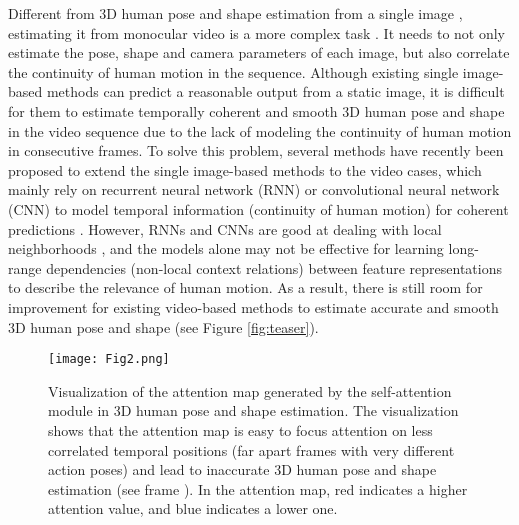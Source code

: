 \documentclass[10pt,twocolumn,letterpaper]{article}
\begin{document}
Different from 3D human pose and shape estimation from a single image \cite{hmrKanazawa17,omran2018nbf,Pavlakos2018LearningTE,Kolotouros2019LearningTR,Georgakis2020HierarchicalKH}, estimating it from monocular video is a more complex task \cite{Kanazawa2019Learning3H,Doersch2019Sim2realTL,Yu2019HumanMR,Kocabas2020VIBEVI,Luo_2020_ACCV,choi2020beyond}. It needs to not only estimate the pose, shape and camera parameters of each image, but also correlate the continuity of human motion in the sequence. Although existing single image-based methods can predict a reasonable output from a static image, it is difficult for them to estimate temporally coherent and smooth 3D human pose and shape in the video sequence due to the lack of modeling the continuity of human motion in consecutive frames.
To solve this problem, several methods have recently been proposed to extend the single image-based methods to the video cases, which mainly rely on recurrent neural network (RNN) or convolutional neural network (CNN) to model temporal information (\ie continuity of human motion) for coherent predictions \cite{Kanazawa2019Learning3H,Doersch2019Sim2realTL,Kocabas2020VIBEVI,Luo_2020_ACCV,choi2020beyond}. However, RNNs and CNNs are good at dealing with local neighborhoods \cite{Vaswani2017AttentionIA,Wang2018NonlocalNN}, and the models alone may not be effective for learning long-range dependencies (\ie non-local context relations) between feature representations to describe the relevance of human motion. As a result, there is still room for improvement for existing video-based methods to estimate accurate and smooth 3D human pose and shape (see Figure \ref{fig:teaser}).

\begin{figure}\centering
  \texttt{[image: Fig2.png]}\vspace{-13pt}
  \caption{Visualization of the attention map generated by the self-attention module \cite{Wang2018NonlocalNN} in 3D human pose and shape estimation. The visualization shows that the attention map is easy to focus attention on less correlated temporal positions (\ie far apart frames with very different action poses) and lead to inaccurate 3D human pose and shape estimation (see frame ). In the attention map, red indicates a higher attention value, and blue indicates a lower one.}\vspace{-13pt}
  \label{fig:fig2}
\end{figure}
\end{document}
